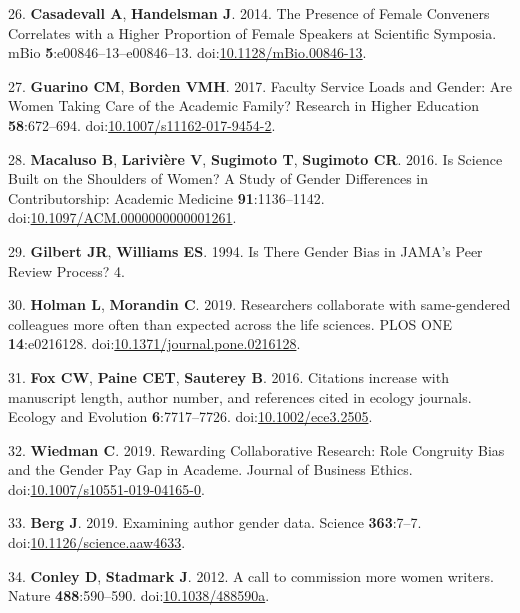 \documentclass[11pt,]{article}
\begin{document}
\hypertarget{ref-casadevall_presence_2014}{}
26. \textbf{Casadevall A}, \textbf{Handelsman J}. 2014. The Presence of
Female Conveners Correlates with a Higher Proportion of Female Speakers
at Scientific Symposia. mBio \textbf{5}:e00846--13--e00846--13.
doi:\href{https://doi.org/10.1128/mBio.00846-13}{10.1128/mBio.00846-13}.

\hypertarget{ref-guarino_faculty_2017}{}
27. \textbf{Guarino CM}, \textbf{Borden VMH}. 2017. Faculty Service
Loads and Gender: Are Women Taking Care of the Academic Family? Research
in Higher Education \textbf{58}:672--694.
doi:\href{https://doi.org/10.1007/s11162-017-9454-2}{10.1007/s11162-017-9454-2}.

\hypertarget{ref-macaluso_is_2016}{}
28. \textbf{Macaluso B}, \textbf{Larivière V}, \textbf{Sugimoto T},
\textbf{Sugimoto CR}. 2016. Is Science Built on the Shoulders of Women?
A Study of Gender Differences in Contributorship: Academic Medicine
\textbf{91}:1136--1142.
doi:\href{https://doi.org/10.1097/ACM.0000000000001261}{10.1097/ACM.0000000000001261}.

\hypertarget{ref-gilbert_is_1994}{}
29. \textbf{Gilbert JR}, \textbf{Williams ES}. 1994. Is There Gender
Bias in JAMA's Peer Review Process? 4.

\hypertarget{ref-holman_researchers_2019}{}
30. \textbf{Holman L}, \textbf{Morandin C}. 2019. Researchers
collaborate with same-gendered colleagues more often than expected
across the life sciences. PLOS ONE \textbf{14}:e0216128.
doi:\href{https://doi.org/10.1371/journal.pone.0216128}{10.1371/journal.pone.0216128}.

\hypertarget{ref-fox_citations_2016}{}
31. \textbf{Fox CW}, \textbf{Paine CET}, \textbf{Sauterey B}. 2016.
Citations increase with manuscript length, author number, and references
cited in ecology journals. Ecology and Evolution \textbf{6}:7717--7726.
doi:\href{https://doi.org/10.1002/ece3.2505}{10.1002/ece3.2505}.

\hypertarget{ref-wiedman_rewarding_2019}{}
32. \textbf{Wiedman C}. 2019. Rewarding Collaborative Research: Role
Congruity Bias and the Gender Pay Gap in Academe. Journal of Business
Ethics.
doi:\href{https://doi.org/10.1007/s10551-019-04165-0}{10.1007/s10551-019-04165-0}.

\hypertarget{ref-berg_examining_2019}{}
33. \textbf{Berg J}. 2019. Examining author gender data. Science
\textbf{363}:7--7.
doi:\href{https://doi.org/10.1126/science.aaw4633}{10.1126/science.aaw4633}.

\hypertarget{ref-conley_call_2012-1}{}
34. \textbf{Conley D}, \textbf{Stadmark J}. 2012. A call to commission
more women writers. Nature \textbf{488}:590--590.
doi:\href{https://doi.org/10.1038/488590a}{10.1038/488590a}.
\end{document}
